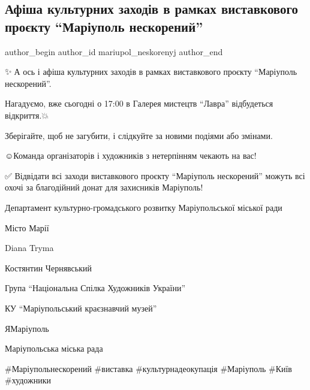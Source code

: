  
 
 
 
 

\subsection{Афіша культурних заходів в рамках виставкового проєкту \enquote{Маріуполь нескорений}}
\label{sec:21_08_2023.fb.mariupol_neskorenyj.1.afisha_kulturnyh_zahodiv}

\ifcmt
 author_begin
   author_id mariupol_neskorenyj
 author_end
\fi

✨️💓А ось і афіша культурних заходів в рамках виставкового проєкту \enquote{Маріуполь нескорений}. \par
Нагадуємо, вже сьогодні о 17:00 в Галерея мистецтв \enquote{Лавра} відбудеться відкриття.💥\par
Зберігайте, щоб не загубити, і слідкуйте за новими подіями або змінами. \par
☺️Команда організаторів і художників з нетерпінням чекають на вас!\par
✅ Відвідати всі заходи виставкового проєкту \enquote{Маріуполь нескорений} можуть всі охочі за благодійний донат для захисників Маріуполь!\par
Департамент культурно-громадського розвитку Маріупольської міської ради \par
Місто Марії \par
Diana Tryma \par
Костянтин Чернявський \par
Група \enquote{Національна Спілка Художників України} \par
КУ \enquote{Маріупольський краєзнавчий музей} \par
ЯМаріуполь \par
Маріупольська міська рада \par
\#Маріупольнескорений \#виставка \#культурнадеокупація \#Маріуполь \#Київ \#художники\par
